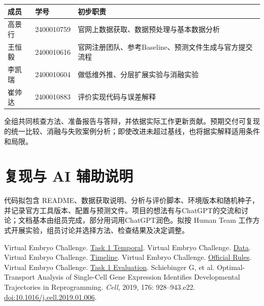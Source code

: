 \documentclass[UTF8,zihao=-4,fontset=none,a4paper]{ctexart}
\newcommand{\smalltable}{\small\renewcommand{\arraystretch}{1.18}}
\begin{document}
\begin{center}
\smalltable
\begin{tabularx}{\linewidth}{@{}p{1.8cm}p{2.5cm}Y@{}}
\toprule
成员 & 学号 & 初步职责\\
\midrule
高景行 & 2400010759 & 官网上数据获取、数据预处理与基本数据分析\\
王恒毅 & 2400010616 & 官网注册团队、参考Baseline、预测文件生成与官方提交流程\\
李凯瑞 & 2400010604 & 做低维外推、分层扩展实验与消融实验\\
崔帅达 & 2400010883 & 评价实现代码与误差解释\\
\bottomrule
\end{tabularx}
\end{center}
全组共同核查方法、准备报告与答辩，并依据实际工作更新贡献。预期交付可复现的统一比较、消融与失败案例分析；即使改进未超过基线，也将据实解释适用条件和局限。

\section{复现与 AI 辅助说明}
代码拟包含 README、数据获取说明、分析与评价脚本、环境版本和随机种子，并记录官方工具版本、配置与预测文件。项目的想法有与ChatGPT的交流和讨论；文档基本由组员完成，部分用词用ChatGPT润色。拟按 Human Team 工作方式开展实验，组员讨论并选择方法、检查结果及决定调整。

\begingroup
\small
\setlength{\parskip}{0pt}
\begin{thebibliography}{9}
\setlength{\itemsep}{1pt}
Virtual Embryo Challenge. \href{https://virtualembryo.ai/challenge/tasks/temporal}{Task 1 Temporal}.
Virtual Embryo Challenge. \href{https://virtualembryo.ai/challenge/data}{Data}.
Virtual Embryo Challenge. \href{https://virtualembryo.ai/challenge/timeline}{Timeline}.
Virtual Embryo Challenge. \href{https://virtualembryo.ai/challenge/rules}{Official Rules}.
Virtual Embryo Challenge. \href{https://virtualembryo.ai/challenge/evaluation?section=scoring\&task=1}{Task 1 Evaluation}.
Schiebinger G, et al. Optimal-Transport Analysis of Single-Cell Gene Expression Identifies Developmental Trajectories in Reprogramming.
\textit{Cell}, 2019, 176: 928--943.e22.
\href{https://doi.org/10.1016/j.cell.2019.01.006}{doi:10.1016/j.cell.2019.01.006}.
\end{thebibliography}
\endgroup
\end{document}

